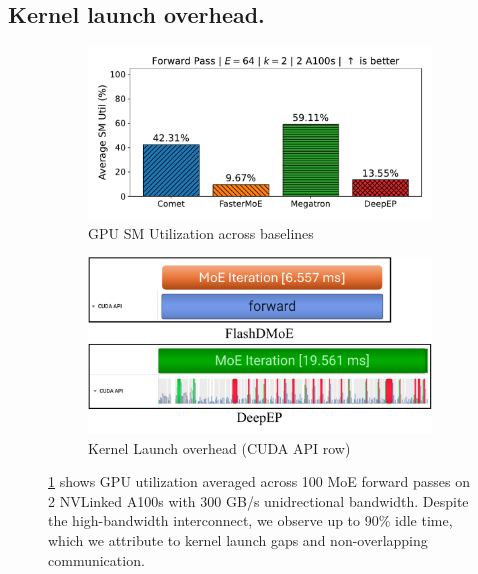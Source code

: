 \subsection{Kernel launch overhead.}\label{subsec:kernel-launch-overhead.}
\begin{figure}[!h]
    \centering
    \begin{subfigure}{0.425\textwidth}
        \centering
        \includegraphics[width=\linewidth, keepaspectratio]{figures/sm_util_b}
        \caption{GPU SM Utilization across baselines}
        \label{sub:util}
    \end{subfigure}
    \begin{subfigure}{0.425\textwidth}
        \centering
        \includegraphics[width=\textwidth, keepaspectratio]{figures/kernel_launch}
        \caption{Kernel Launch overhead (CUDA API row)}
        \label{sub:launch}
    \end{subfigure}
    \caption{\ref{sub:util} shows GPU utilization averaged across 100 MoE forward passes on 2 NVLinked A100s with
    300 GB/s unidrectional bandwidth.
    Despite the high-bandwidth interconnect, we observe up to 90\% idle time,
        which we attribute to kernel launch gaps and non-overlapping communication.}
    \label{fig:kl}
\end{figure}
